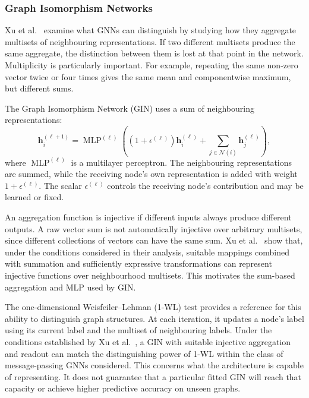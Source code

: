 \documentclass[11pt,a4paper]{article}
\begin{document}
\subsubsection{Graph Isomorphism Networks}
\label{sec:gin}

Xu et al.~\cite{xu2019powerful} examine what GNNs can distinguish by studying how they aggregate multisets of neighbouring representations. If two different multisets produce the same aggregate, the distinction between them is lost at that point in the network. Multiplicity is particularly important. For example, repeating the same non-zero vector twice or four times gives the same mean and componentwise maximum, but different sums.

The Graph Isomorphism Network (GIN) uses a sum of neighbouring representations:
\begin{equation}
\mathbf{h}_i^{(\ell+1)}
=
\operatorname{MLP}^{(\ell)}
\!\left(
(1+\epsilon^{(\ell)})
\mathbf{h}_i^{(\ell)}
+
\sum_{j\in\mathcal{N}(i)}
\mathbf{h}_j^{(\ell)}
\right),
\label{eq:gin}
\end{equation}
where \(\operatorname{MLP}^{(\ell)}\) is a multilayer perceptron. The neighbouring representations are summed, while the receiving node's own representation is added with weight \(1+\epsilon^{(\ell)}\). The scalar \(\epsilon^{(\ell)}\) controls the receiving node's contribution and may be learned or fixed.

An aggregation function is injective if different inputs always produce different outputs. A raw vector sum is not automatically injective over arbitrary multisets, since different collections of vectors can have the same sum. Xu et al.~\cite{xu2019powerful} show that, under the conditions considered in their analysis, suitable mappings combined with summation and sufficiently expressive transformations can represent injective functions over neighbourhood multisets. This motivates the sum-based aggregation and MLP used by GIN.

The one-dimensional Weisfeiler--Lehman (1-WL) test provides a reference for this ability to distinguish graph structures. At each iteration, it updates a node's label using its current label and the multiset of neighbouring labels. Under the conditions established by Xu et al.~\cite{xu2019powerful}, a GIN with suitable injective aggregation and readout can match the distinguishing power of 1-WL within the class of message-passing GNNs considered. This concerns what the architecture is capable of representing. It does not guarantee that a particular fitted GIN will reach that capacity or achieve higher predictive accuracy on unseen graphs.
\end{document}
